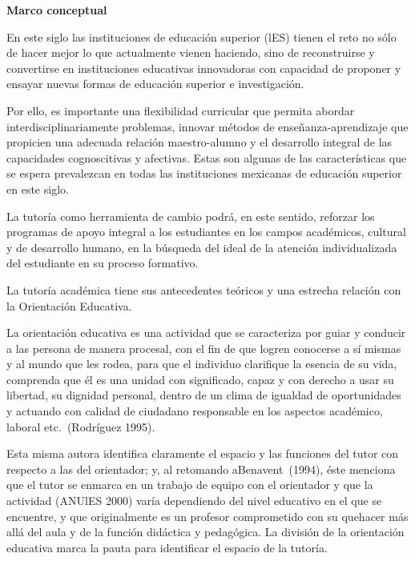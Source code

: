 \bigskip
\textbf{Marco conceptual}

En este siglo  las instituciones   de educación  superior  (lES)  tienen  el reto  no sólo de  hacer  mejor  lo  que  actualmente   vienen   haciendo,   sino  de reconstruirse y convertirse en    instituciones   educativas    innovadoras  con  capacidad   de  proponer   y  ensayar nuevas formas  de educación  superior  e investigación.

Por    ello,    es    importante  una    flexibilidad     curricular    que    permita     abordar interdisciplinariamente     problemas,    innovar   métodos   de   en\-se\-ñan\-za-apren\-di\-za\-je que   propicien   una   adecuada relación maestro-alumno y el desarrollo    integral   de   las capacidades   cognoscitivas   y afectivas.    Estas  son algunas  de  las  características que se espera prevalezcan  en todas  las instituciones  mexicanas  de educación superior  en este siglo.

La tutoría  como  herramienta   de  cambio  podrá, en este sentido,  reforzar  los  programas   de  apoyo integral  a  los  estudiantes   en  los  campos  académicos,   cultural   y  de  desarrollo humano,  en la búsqueda  del ideal de la atención  individualizada   del estudiante  en su proceso  formativo.

La tutoría  académica  tiene sus antecedentes  teóricos y una estrecha relación con la  Orientación Educativa.

La orientación   educativa   es una actividad  que se caracteriza   por  guiar  y conducir  a las persona de  manera  procesal, con el fin de  que logren conocerse   a  sí  mismas   y al mundo  que  les  rodea,   para  que  el  individuo   clarifique  la  esencia   de  su  vida, comprenda  que  él es una  unidad  con significado,  capaz  y con  derecho  a usar su libertad,  su dignidad  personal,  dentro  de un clima de igualdad  de  oportunidades   y actuando   con  calidad   de  ciudadano   responsable   en  los  aspectos académico, laboral etc.\ (Rodríguez  1995).

\enlargethispage{1\baselineskip}
\begin{sloppypar}
Esta  misma  autora  identifica  claramente  el espacio  y las funciones  del  tutor  con respecto  a las del  orientador;  y, al retomando a\linebreak Benavent~(1994),  éste  menciona  que el tutor se enmarca   en  un trabajo  de equipo  con el orientador  y que  la actividad (ANUlES 2000) varía dependiendo   del nivel  educativo  en el que se encuentre, y que originalmente es un profesor comprometido con su quehacer más allá del aula y de la función didáctica y pedagógica. La división de la orientación educativa marca la pauta para identificar  el espacio de la tutoría.
\end{sloppypar}

